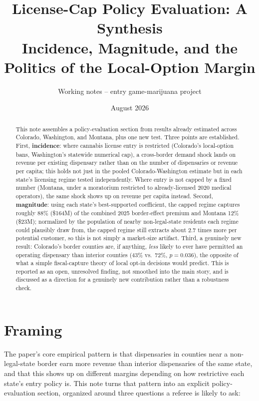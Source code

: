 \documentclass[11pt]{article}
\title{License-Cap Policy Evaluation: A Synthesis\\
\large Incidence, Magnitude, and the Politics of the Local-Option Margin}
\author{Working notes -- entry game-marijuana project}
\date{August 2026}
\begin{document}
\maketitle

\begin{abstract}
\noindent This note assembles a policy-evaluation section from results already estimated across
Colorado, Washington, and Montana, plus one new test. Three points are established. First,
\textbf{incidence}: where cannabis license entry is restricted (Colorado's local-option bans,
Washington's statewide numerical cap), a cross-border demand shock lands on revenue per existing
dispensary rather than on the number of dispensaries or revenue per capita; this holds not just in the
pooled Colorado-Washington estimate but in each state's licensing regime tested independently. Where
entry is not capped by a fixed number (Montana, under a moratorium restricted to already-licensed 2020
medical operators), the same shock shows up on revenue per capita instead. Second, \textbf{magnitude}:
using each state's best-supported coefficient, the capped regime captures roughly 88\% (\$164M) of the
combined 2025 border-effect premium and Montana 12\% (\$23M); normalized by the population of nearby
non-legal-state residents each regime could plausibly draw from, the capped regime still extracts about
2.7 times more per potential customer, so this is not simply a market-size artifact. Third, a genuinely
new result: Colorado's border counties are, if anything, \emph{less} likely to ever have permitted an
operating dispensary than interior counties (43\% vs.\ 72\%, $p=0.036$), the opposite of what a simple
fiscal-capture theory of local opt-in decisions would predict. This is reported as an open, unresolved
finding, not smoothed into the main story, and is discussed as a direction for a genuinely new
contribution rather than a robustness check.
\end{abstract}

\tableofcontents

\section{Framing}

The paper's core empirical pattern is that dispensaries in counties near a non-legal-state border earn
more revenue than interior dispensaries of the same state, and that this shows up on different margins
depending on how restrictive each state's entry policy is. This note turns that pattern into an explicit
policy-evaluation section, organized around three questions a referee is likely to ask:
\end{document}
